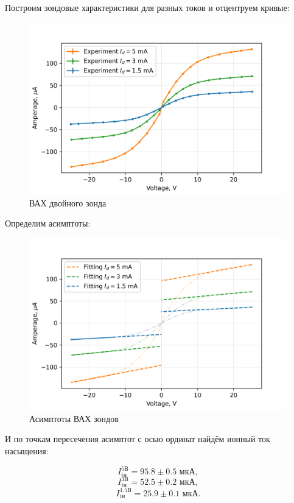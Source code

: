 Построим зондовые характеристики для разных токов и отцентруем кривые:

\begin{figure}[!h]
    \centering
    \includegraphics[height=\imageheight]{images/vah-probe.png}
    \caption{ВАХ двойного зонда}
    \label{fig:my_label}
\end{figure}

\newpage
Определим асимптоты:

\begin{figure}
    \centering
    \includegraphics{images/vah-probe-fit.png}
    \caption{Асимптоты ВАХ зондов}
    \label{fig:my_label}
\end{figure}

И по точкам пересечения асимптот с осью ординат найдём ионный ток насыщения:

\[I_{i\text{н}}^{5\text{В}}     = 95.8 \pm 0.5 \text{ мкА},\]
\[I_{i\text{н}}^{3\text{В}}     = 52.5 \pm 0.2 \text{ мкА},\]
\[I_{i\text{н}}^{1.5\text{В}}   = 25.9 \pm 0.1 \text{ мкА}.\]

